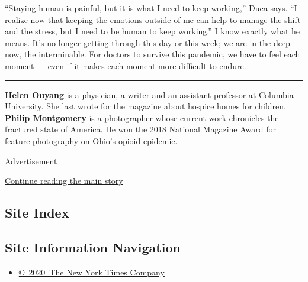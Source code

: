 ``Staying human is painful, but it is what I need to keep working,''
Duca says. ``I realize now that keeping the emotions outside of me can
help to manage the shift and the stress, but I need to be human to keep
working.'' I know exactly what he means. It's no longer getting through
this day or this week; we are in the deep now, the interminable. For
doctors to survive this pandemic, we have to feel each moment --- even
if it makes each moment more difficult to endure.

\begin{center}\rule{0.5\linewidth}{\linethickness}\end{center}

\textbf{Helen Ouyang} is a physician, a writer and an assistant
professor at Columbia University. She last wrote for the magazine about
hospice homes for children. \textbf{Philip Montgomery} is a photographer
whose current work chronicles the fractured state of America. He won the
2018 National Magazine Award for feature photography on Ohio's opioid
epidemic.

Advertisement

\protect\hyperlink{after-bottom}{Continue reading the main story}

\hypertarget{site-index}{%
\subsection{Site Index}\label{site-index}}

\hypertarget{site-information-navigation}{%
\subsection{Site Information
Navigation}\label{site-information-navigation}}

\begin{itemize}
\tightlist
\item
  \href{https://help.nytimes3xbfgragh.onion/hc/en-us/articles/115014792127-Copyright-notice}{©~2020~The
  New York Times Company}
\end{itemize}

